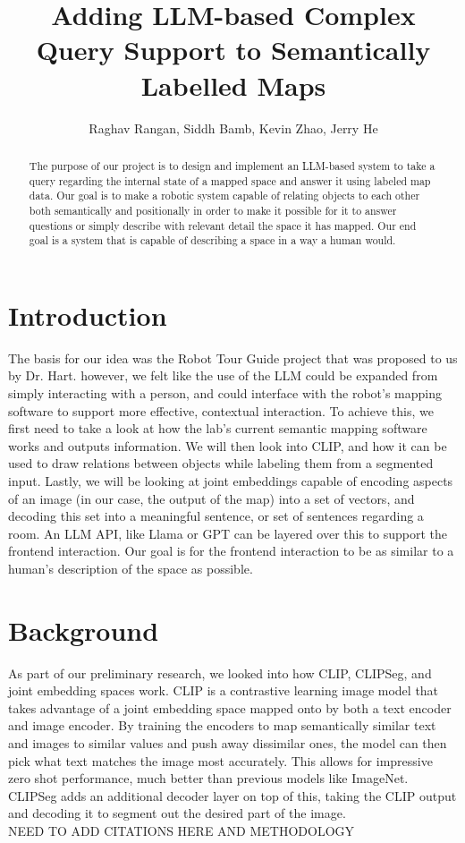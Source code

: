 \documentclass[letterpaper, 10 pt, conference]{ieeeconf}  %
\title{\LARGE \bf
Adding LLM-based Complex Query Support to Semantically Labelled Maps}
\author{Raghav Rangan, Siddh Bamb, Kevin Zhao, Jerry He%
}
\begin{document}
\maketitle
\thispagestyle{empty}
\pagestyle{empty}


\begin{abstract}
    The purpose of our project is to design and implement an LLM-based system to take a query regarding the internal state of a mapped space and answer it using labeled map data. Our goal is to make a robotic system capable of relating objects to each other both semantically and positionally in order to make it possible for it to answer questions or simply describe with relevant detail the space it has mapped. Our end goal is a system that is capable of describing a space in a way a human would.
\end{abstract}
    
\section{Introduction}
    The basis for our idea was the Robot Tour Guide project that was proposed to us by Dr. Hart. however, we felt like the use of the LLM could be expanded from simply interacting with a person, and could interface with the robot's mapping software to support more effective, contextual interaction. To achieve this, we first need to take a look at how the lab's current semantic mapping software works and outputs information. We will then look into CLIP, and how it can be used to draw relations between objects while labeling them from a segmented input. Lastly, we will be looking at joint embeddings capable of encoding aspects of an image (in our case, the output of the map) into a set of vectors, and decoding this set into a meaningful sentence, or set of sentences regarding a room. An LLM API, like Llama or GPT can be layered over this to support the frontend interaction. Our goal is for the frontend interaction to be as similar to a human's description of the space as possible.

\section{Background}
    As part of our preliminary research, we looked into how CLIP, CLIPSeg, and joint embedding spaces work. CLIP is a contrastive learning image model that takes advantage of a joint embedding space mapped onto by both a text encoder and image encoder. By training the encoders to map semantically similar text and images to similar values and push away dissimilar ones, the model can then pick what text matches the image most accurately. This allows for impressive zero shot performance, much better than previous models like ImageNet. CLIPSeg adds an additional decoder layer on top of this, taking the CLIP output and decoding it to segment out the desired part of the image.
    \\
    NEED TO ADD CITATIONS HERE AND METHODOLOGY
\end{document}
